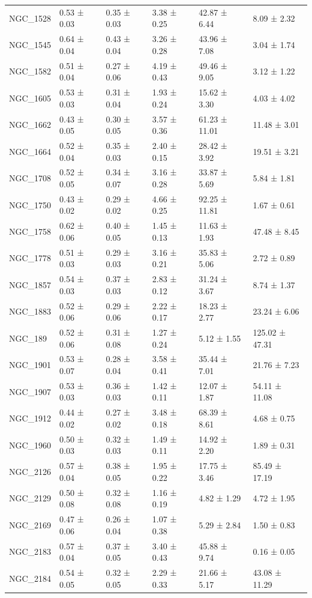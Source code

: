 \begin{tabular}{llllll}
NGC_1528 & 0.53 ± 0.03 & 0.35 ± 0.03 & 3.38 ± 0.25 & 42.87 ± 6.44 & 8.09 ± 2.32 \\
NGC_1545 & 0.64 ± 0.04 & 0.43 ± 0.04 & 3.26 ± 0.28 & 43.96 ± 7.08 & 3.04 ± 1.74 \\
NGC_1582 & 0.51 ± 0.04 & 0.27 ± 0.06 & 4.19 ± 0.43 & 49.46 ± 9.05 & 3.12 ± 1.22 \\
NGC_1605 & 0.53 ± 0.03 & 0.31 ± 0.04 & 1.93 ± 0.24 & 15.62 ± 3.30 & 4.03 ± 4.02 \\
NGC_1662 & 0.43 ± 0.05 & 0.30 ± 0.05 & 3.57 ± 0.36 & 61.23 ± 11.01 & 11.48 ± 3.01 \\
NGC_1664 & 0.52 ± 0.04 & 0.35 ± 0.03 & 2.40 ± 0.15 & 28.42 ± 3.92 & 19.51 ± 3.21 \\
NGC_1708 & 0.52 ± 0.05 & 0.34 ± 0.07 & 3.16 ± 0.28 & 33.87 ± 5.69 & 5.84 ± 1.81 \\
NGC_1750 & 0.43 ± 0.02 & 0.29 ± 0.02 & 4.66 ± 0.25 & 92.25 ± 11.81 & 1.67 ± 0.61 \\
NGC_1758 & 0.62 ± 0.06 & 0.40 ± 0.05 & 1.45 ± 0.13 & 11.63 ± 1.93 & 47.48 ± 8.45 \\
NGC_1778 & 0.51 ± 0.03 & 0.29 ± 0.03 & 3.16 ± 0.21 & 35.83 ± 5.06 & 2.72 ± 0.89 \\
NGC_1857 & 0.54 ± 0.03 & 0.37 ± 0.03 & 2.83 ± 0.12 & 31.24 ± 3.67 & 8.74 ± 1.37 \\
NGC_1883 & 0.52 ± 0.06 & 0.29 ± 0.06 & 2.22 ± 0.17 & 18.23 ± 2.77 & 23.24 ± 6.06 \\
NGC_189 & 0.52 ± 0.06 & 0.31 ± 0.08 & 1.27 ± 0.24 & 5.12 ± 1.55 & 125.02 ± 47.31 \\
NGC_1901 & 0.53 ± 0.07 & 0.28 ± 0.04 & 3.58 ± 0.41 & 35.44 ± 7.01 & 21.76 ± 7.23 \\
NGC_1907 & 0.53 ± 0.03 & 0.36 ± 0.03 & 1.42 ± 0.11 & 12.07 ± 1.87 & 54.11 ± 11.08 \\
NGC_1912 & 0.44 ± 0.02 & 0.27 ± 0.02 & 3.48 ± 0.18 & 68.39 ± 8.61 & 4.68 ± 0.75 \\
NGC_1960 & 0.50 ± 0.03 & 0.32 ± 0.03 & 1.49 ± 0.11 & 14.92 ± 2.20 & 1.89 ± 0.31 \\
NGC_2126 & 0.57 ± 0.04 & 0.38 ± 0.05 & 1.95 ± 0.22 & 17.75 ± 3.46 & 85.49 ± 17.19 \\
NGC_2129 & 0.50 ± 0.08 & 0.32 ± 0.08 & 1.16 ± 0.19 & 4.82 ± 1.29 & 4.72 ± 1.95 \\
NGC_2169 & 0.47 ± 0.06 & 0.26 ± 0.04 & 1.07 ± 0.38 & 5.29 ± 2.84 & 1.50 ± 0.83 \\
NGC_2183 & 0.57 ± 0.04 & 0.37 ± 0.05 & 3.40 ± 0.43 & 45.88 ± 9.74 & 0.16 ± 0.05 \\
NGC_2184 & 0.54 ± 0.05 & 0.32 ± 0.05 & 2.29 ± 0.33 & 21.66 ± 5.17 & 43.08 ± 11.29 \\

\end{tabular}
